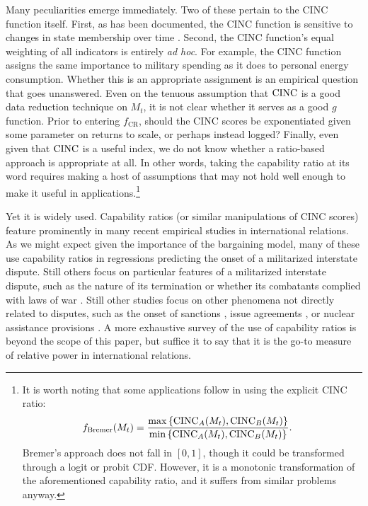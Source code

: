 Many peculiarities emerge immediately. 
Two of these pertain to the CINC function itself. 
First, as has been documented, the CINC function is sensitive to changes in state membership over time \citep{organski1980,gleditsch1999,kadera2004}. 
Second, the CINC function's equal weighting of all indicators is entirely \emph{ad hoc}. 
For example, the CINC function assigns the same importance to military spending as it does to personal energy consumption. 
Whether this is an appropriate assignment is an empirical question that goes unanswered. 
Even on the tenuous assumption that $\operatorname{CINC}$ is a good data reduction technique on $M_t$, it is not clear whether it serves as a good $g$ function. 
Prior to entering $f_{\text{CR}}$, should the CINC scores be exponentiated given some parameter on returns to scale, or perhaps instead logged? 
Finally, even given that $\operatorname{CINC}$ is a useful index, we do not know whether a ratio-based approach is appropriate at all. 
In other words, taking the capability ratio at its word requires making a host of assumptions that may not hold well enough to make it useful in applications.\footnote{
  It is worth noting that some applications follow \citet{bremer1992} in using the explicit CINC ratio:
  \begin{align*}
    f_{\text{Bremer}}(M_t) &= \frac{\max\left\{\operatorname{CINC}_A(M_t),\operatorname{CINC}_B(M_t)\right\}}{\min\left\{\operatorname{CINC}_A(M_t),\operatorname{CINC}_B(M_t)\right\}}.
  \end{align*}
  Bremer's approach does not fall in $[0,1]$, though it could be transformed through a logit or probit CDF. 
  However, it is a monotonic transformation of the aforementioned capability ratio, and it suffers from similar problems anyway.
}

Yet it is widely used. Capability ratios (or similar manipulations of CINC scores) feature prominently in many recent empirical studies in international relations. 
As we might expect given the importance of the bargaining model, many of these \citep[e.g.][]{gartzke2007,salehyan2008} use capability ratios in regressions predicting the onset of a militarized interstate dispute. 
Still others focus on particular features of a militarized interstate dispute, such as the nature of its termination \citep{beardsley2008} or whether its combatants complied with laws of war \citep{morrow2007}. 
Still other studies focus on other phenomena not directly related to disputes, such as the onset of sanctions \citep{whang2013}, issue agreements \citep{mitchell2007}, or nuclear assistance provisions \citep{kroenig2009}. 
A more exhaustive survey of the use of capability ratios is beyond the scope of this paper, but suffice it to say that it is the go-to measure of relative power in international relations.

